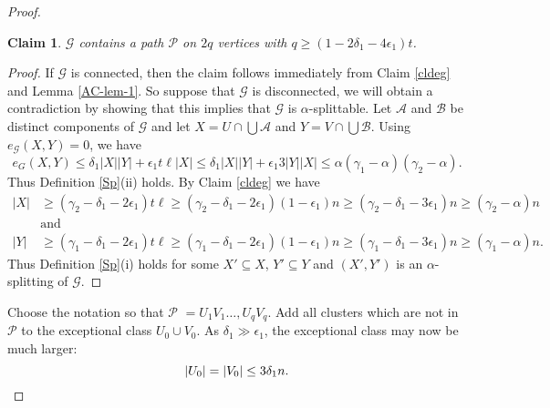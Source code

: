 \documentclass[oneside,12pt]{memoir}
\newtheorem{claim}[theorem]{Claim}
\newcommand{\ep}{\epsilon}
\newcommand{\g}{\gamma}
\begin{document}
\begin{proof}
% 

\begin{claim}\label{clpath}
$\mathcal{G}$ contains a path $\mathcal{P}$ on $2q$ vertices with $q \geq (1-2\delta_1-4\ep_1)t$. 
\end{claim}

\begin{proof}
If $\mathcal{G}$ is connected, then the claim follows immediately from Claim \ref{cldeg} and Lemma \ref{AC-lem-1}.  So suppose that $\mathcal{G}$ is disconnected, we will obtain a contradiction by showing that this implies that $\mathcal{G}$ is $\alpha$-splittable. Let $\mathcal{A}$ and $\mathcal{B}$ be distinct components of $\mathcal{G}$ and let $X=U\cap\bigcup\mathcal{A}$ and $Y=V\cap\bigcup\mathcal{B}$. Using $e_{\mathcal{G}}(X,Y)=0$, we have 
\[
e_{G}(X,Y)\leq\delta_{1}|X||Y|+\ep_{1}t\ell|X|
\le \delta_{1}|X||Y|+\ep_{1}3|Y||X|
\le \alpha (\g_1-\alpha)(\g_2-\alpha).
\]
Thus Definition \ref{Sp}(ii) holds. By Claim \ref{cldeg} we have
\begin{align*}
|X|&\geq(\g_{2} -\delta_{1}-2\ep_{1})t\ell\geq(\g_{2} -\delta_{1}-2\ep_{1})(1-\ep_{1})n\geq(\g_{2} -\delta_{1}-3\ep_{1})n\ge(\g_{2}-\alpha)n\\
&\text{and}\\
|Y|&\geq(\g_{1} -\delta_{1}-2\ep_{1})t\ell\geq(\g_{1} -\delta_{1}-2\ep_{1})(1-\ep_{1})n\geq(\g_{1} -\delta_{1}-3\ep_{1})n\ge(\g_{1}-\alpha)n.
\end{align*}
Thus Definition \ref{Sp}(i) holds for some $X'\subseteq X$, $Y'\subseteq Y$ and $(X',Y')$ is an $\alpha$-splitting of $\mathcal{G}$.
\end{proof}

Choose the notation so that $\mathcal{P}$ $=U_{1}V_{1} \dots,U_{q}V_{q}$. 
Add all clusters which are not in $\mathcal{P}$ to the exceptional class $U_0 \cup V_0$. 
As $\delta_1 \gg \ep_1$, the exceptional class may now be much larger: 
\begin{equation}
|U_0|=|V_0| \le 3\delta_1 n.
\notag
\end{equation}


\end{proof}
\end{document}

